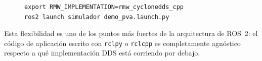 \begin{figure}[H]
\centering
\begin{lstlisting}[style=bash, caption={Selección de implementación DDS en tiempo de ejecución.}, label={lst:rmw_impl}]
export RMW_IMPLEMENTATION=rmw_cyclonedds_cpp
ros2 launch simulador demo_pva.launch.py
\end{lstlisting}
\end{figure}

Esta flexibilidad es uno de los puntos más fuertes de la arquitectura de ROS~2: el código de aplicación escrito con \texttt{rclpy} o \texttt{rclcpp} es completamente agnóstico respecto a qué implementación DDS está corriendo por debajo.
